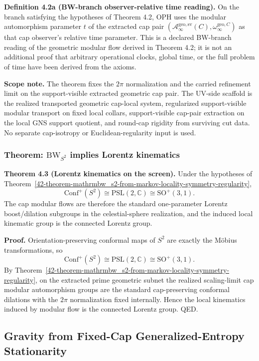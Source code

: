 \textbf{Definition 4.2a (BW-branch observer-relative time reading).}
On the branch satisfying the hypotheses of Theorem 4.2, OPH uses the modular automorphism
parameter \(t\) of the extracted cap pair
\((\mathcal A_\infty^{\mathrm{geo,sv}}(C),\omega_\infty^{\mathrm{geo},C})\) as that cap
observer's relative time parameter. This is a declared BW-branch reading of the geometric
modular flow derived in Theorem 4.2; it is not an additional proof that arbitrary operational
clocks, global time, or the full problem of time have been derived from the axioms.

\textbf{Scope note.} The theorem fixes the \(2\pi\) normalization and the carried refinement limit on the support-visible extracted geometric cap pair. The UV-side scaffold is the realized transported geometric cap-local system, regularized support-visible modular transport on fixed local collars, support-visible cap-pair extraction on the local GNS support quotient, and round-cap rigidity from surviving cut data. No separate cap-isotropy or Euclidean-regularity input is used.
\subsubsection{\texorpdfstring{Theorem: \(\mathrm{BW}_{S^2}\) implies Lorentz kinematics}{4.3 Theorem: \textbackslash mathrm\{BW\}\_\{S\^{}2\} implies Lorentz kinematics}}\label{43-theorem-mathrmbw_s2-implies-lorentz-kinematics}

\textbf{Theorem 4.3 (Lorentz kinematics on the screen).} Under the hypotheses of Theorem~\ref{42-theorem-mathrmbw_s2-from-markov-locality-symmetry-regularity},
\[
\mathrm{Conf}^+(S^2)\cong \mathrm{PSL}(2,\mathbb C)\cong \mathrm{SO}^+(3,1).
\]
The cap modular flows are therefore the standard one-parameter Lorentz boost/dilation subgroups in the celestial-sphere realization, and the induced local kinematic group is the connected Lorentz group.

\textbf{Proof.} Orientation-preserving conformal maps of \(S^2\) are exactly the M\"obius transformations, so
\[
\mathrm{Conf}^+(S^2)\cong \mathrm{PSL}(2,\mathbb C)\cong \mathrm{SO}^+(3,1).
\]
By Theorem~\ref{42-theorem-mathrmbw_s2-from-markov-locality-symmetry-regularity}, on the extracted prime geometric subnet the realized scaling-limit cap modular automorphism groups are the standard cap-preserving conformal dilations with the \(2\pi\) normalization fixed internally. Hence the local kinematics induced by modular flow is the connected Lorentz group. QED.
\subsection{Gravity from Fixed-Cap Generalized-Entropy Stationarity}\label{5-gravity-from-entanglement-equilibrium}

